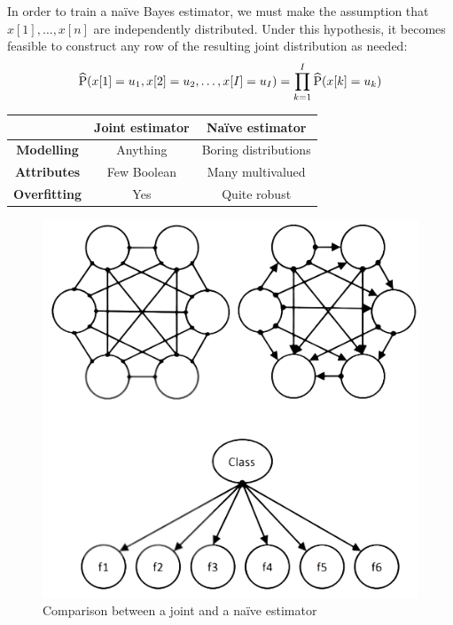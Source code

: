 In order to train a naïve Bayes estimator, we must make the assumption that $x[1],\dots,x[n]$ are independently distributed. 
Under this hypothesis, it becomes feasible to construct any row of the resulting joint distribution as needed:
\[\widehat{\textnormal{P}}(x[1]=u_1,x[2]=u_2,\dots,x[I]=u_I) = \prod_{k=1}^{I} \widehat{\textnormal{P}}(x[k]=u_k)\]
\begin{table}[H]
    \centering
    \begin{tabular}{c|c|c|}
    \cline{2-3}
                                                & \textbf{Joint estimator} & \textbf{Naïve estimator} \\ \hline
    \multicolumn{1}{|c|}{\textbf{Modelling}}   & Anything                 & Boring distributions     \\ 
    \multicolumn{1}{|c|}{\textbf{Attributes}}  & Few Boolean              & Many multivalued         \\ 
    \multicolumn{1}{|c|}{\textbf{Overfitting}} & Yes                      & Quite robust             \\ \hline
    \end{tabular}
\end{table}
\begin{figure}[H]
    \centering
    \includegraphics[width=0.35\linewidth]{images/naive-joint.png}
    \caption{Comparison between a joint and a naïve estimator}
\end{figure}